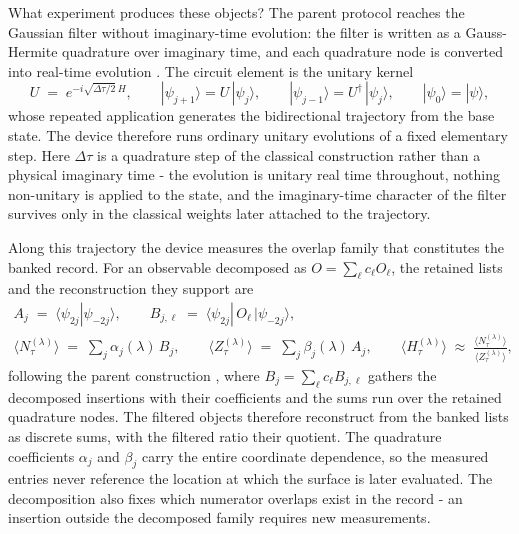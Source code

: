 What experiment produces these objects? The parent protocol reaches the Gaussian filter without imaginary-time evolution: the filter is written as a Gauss-Hermite quadrature over imaginary time, and each quadrature node is converted into real-time evolution \cite{leamer2024emulation,mccaul2025snacks}. The circuit element is the unitary kernel
\begin{equation}\label{def:itqde-unitary-kernel}
U \;=\; e^{-i\sqrt{\Delta\tau/2}\,H}, \qquad |\psi_{j+1}\rangle = U\,|\psi_j\rangle, \qquad |\psi_{j-1}\rangle = U^{\dagger}\,|\psi_j\rangle, \qquad |\psi_0\rangle = |\psi\rangle,
\end{equation}
whose repeated application generates the bidirectional trajectory from the base state. The device therefore runs ordinary unitary evolutions of a fixed elementary step. Here $\Delta\tau$ is a quadrature step of the classical construction rather than a physical imaginary time - the evolution is unitary real time throughout, nothing non-unitary is applied to the state, and the imaginary-time character of the filter survives only in the classical weights later attached to the trajectory.

Along this trajectory the device measures the overlap family that constitutes the banked record. For an observable decomposed as $O = \sum_\ell c_\ell O_\ell$, the retained lists and the reconstruction they support are
\begin{equation}\label{def:retained-overlaps}
\begin{gathered}
A_j \;=\; \langle \psi_{2j} | \psi_{-2j} \rangle, \qquad B_{j,\ell} \;=\; \langle \psi_{2j} |\, O_\ell\, | \psi_{-2j} \rangle,\\[2pt]
\langle N_\tau^{(\lambda)} \rangle \;=\; \sum_{j} \alpha_j(\lambda)\, B_j, \qquad \langle Z_\tau^{(\lambda)} \rangle \;=\; \sum_{j} \beta_j(\lambda)\, A_j, \qquad \langle H_\tau^{(\lambda)} \rangle \;\approx\; \frac{\langle N_\tau^{(\lambda)} \rangle}{\langle Z_\tau^{(\lambda)} \rangle},
\end{gathered}
\end{equation}
following the parent construction \cite{mccaul2025snacks}, where $B_j = \sum_\ell c_\ell B_{j,\ell}$ gathers the decomposed insertions with their coefficients and the sums run over the retained quadrature nodes. The filtered objects therefore reconstruct from the banked lists as discrete sums, with the filtered ratio their quotient. The quadrature coefficients $\alpha_j$ and $\beta_j$ carry the entire coordinate dependence, so the measured entries never reference the location at which the surface is later evaluated. The decomposition also fixes which numerator overlaps exist in the record - an insertion outside the decomposed family requires new measurements.

